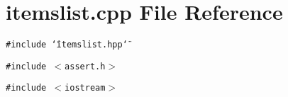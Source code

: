 \section{itemslist.cpp File Reference}
\label{itemslist_8cpp}
{\tt \#include \char`\"{}itemslist.hpp\char`\"{}}\par
{\tt \#include $<$assert.h$>$}\par
{\tt \#include $<$iostream$>$}\par

